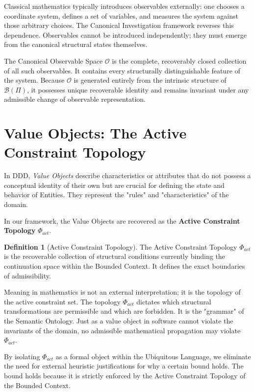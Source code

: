 \documentclass[12pt,openany]{extbook}
\theoremstyle{plain}
\theoremstyle{definition}
\newtheorem{definition}{Definition}[chapter]
\begin{document}
Classical mathematics typically introduces observables externally: one chooses a coordinate system, defines a set of variables, and measures the system against those arbitrary choices. The Canonical Investigation framework reverses this dependence. Observables cannot be introduced independently; they must emerge from the canonical structural states themselves. 

The Canonical Observable Space $\mathcal{O}$ is the complete, recoverably closed collection of all such observables. It contains every structurally distinguishable feature of the system. Because $\mathcal{O}$ is generated entirely from the intrinsic structure of $\mathcal{B}(\Pi)$, it possesses unique recoverable identity and remains invariant under any admissible change of observable representation.

\section{Value Objects: The Active Constraint Topology}

In DDD, \emph{Value Objects} describe characteristics or attributes that do not possess a conceptual identity of their own but are crucial for defining the state and behavior of Entities. They represent the "rules" and "characteristics" of the domain.

In our framework, the Value Objects are recovered as the \textbf{Active Constraint Topology} $\Phi_{act}$.

\begin{definition}[Active Constraint Topology]
The Active Constraint Topology $\Phi_{act}$ is the recoverable collection of structural conditions currently binding the continuation space within the Bounded Context. It defines the exact boundaries of admissibility.
\end{definition}

Meaning in mathematics is not an external interpretation; it is the topology of the active constraint set. The topology $\Phi_{act}$ dictates which structural transformations are permissible and which are forbidden. It is the "grammar" of the Semantic Ontology. Just as a value object in software cannot violate the invariants of the domain, no admissible mathematical propagation may violate $\Phi_{act}$. 

By isolating $\Phi_{act}$ as a formal object within the Ubiquitous Language, we eliminate the need for external heuristic justifications for why a certain bound holds. The bound holds because it is strictly enforced by the Active Constraint Topology of the Bounded Context.
\end{document}
